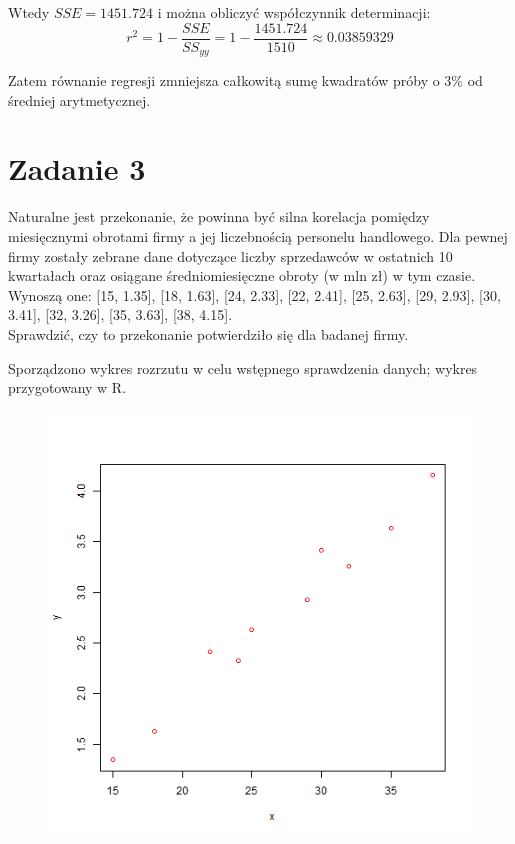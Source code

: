 \documentclass{article}
\begin{document}
Wtedy $SSE = 1451.724$ i można obliczyć współczynnik determinacji:
\[ r^2 = 1 - \frac{SSE}{SS_{yy}} = 1 - \frac{1451.724}{1510} \approx 0.03859329 \]

Zatem równanie regresji zmniejsza całkowitą sumę kwadratów próby o 3\% od średniej arytmetycznej.

\newpage
\section{Zadanie 3}
Naturalne jest przekonanie, że powinna być silna korelacja pomiędzy miesięcznymi obrotami firmy a jej liczebnością personelu handlowego. Dla pewnej firmy zostały zebrane dane dotyczące liczby sprzedawców w ostatnich 10 kwartałach oraz osiągane średniomiesięczne obroty (w mln zł) w tym czasie. \\
Wynoszą one: [15, 1.35], [18, 1.63], [24, 2.33], [22, 2.41], [25, 2.63], [29, 2.93], [30, 3.41], [32, 3.26], [35, 3.63], [38, 4.15].\\
Sprawdzić, czy to przekonanie potwierdziło się dla badanej firmy. \\ \par

Sporządzono wykres rozrzutu w celu wstępnego sprawdzenia danych; wykres przygotowany w R.
\begin{figure}[h!]
\begin{center}
\includegraphics[height = 0.5\textheight, angle = 0]{"w11zad3.png"}
\end{center} \end{figure} 
\end{document}
